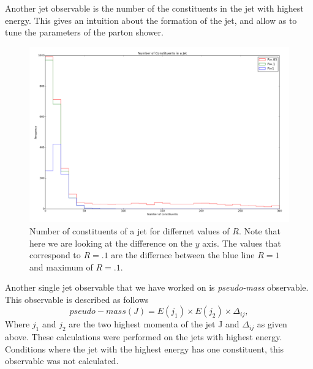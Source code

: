 Another jet observable is the number of the constituents in the jet with highest energy.  This gives an intuition about the formation of the jet, and allow as to tune the parameters of the parton shower.
\begin{figure}[hbtp]
\centering
\includegraphics[scale=.3]{images/figure_12.png}
\caption{Number of constituents of a jet for differnet  values of $R$.  Note that here we are looking at the difference on the $y$ axis. The values that correspond to $R = .1$ are the differnce between the blue line $R = 1$ and maximum of $R = .1$.}\label{nofcon}
\end{figure}


Another single jet observable that we have worked on is \textit{pseudo-mass} observable. This observable is described as follows \begin{equation}
pseudo-mass(J) = E(j_1) \times E(j_2) \times \Delta_{ij} ,
\end{equation}   Where $j_1$ and $j_2$ are the two highest  momenta of the jet J and $\Delta_{ij}$ as given above.
These calculations were performed on the jets with highest energy.
Conditions where
the jet with the highest energy has one constituent, this observable was not calculated.


